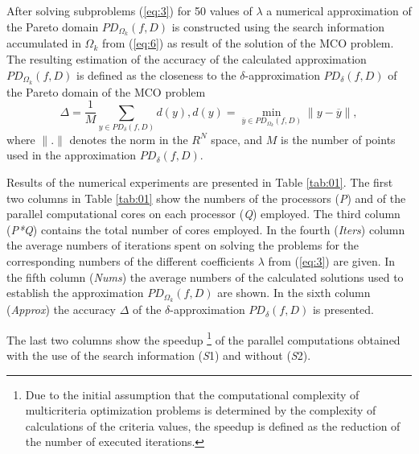 \documentclass[runningheads]{llncs}
\begin{document}
After solving subproblems (\ref{eq:3}) for 50 values of $\lambda$ a numerical approximation of the Pareto domain $PD_{\Omega_k}(f,D)$ is constructed using the search information accumulated in $\Omega_k$ from (\ref{eq:6}) as result of the solution of the MCO problem. The resulting estimation of the accuracy of the calculated approximation $PD_{\Omega_k}(f,D)$ is defined as the closeness to the $\delta$-approximation $PD_\delta(f,D)$ of the Pareto domain of the MCO problem 
\begin{equation}\label{eq:18}
\Delta=\frac{1}{M} \sum_{y\in PD_\delta(f,D)}{d(y)}, d(y)=\min_{\overline{y}\in PD_{\Omega_k}(f,D)}{\|y-\overline{y}\|},
\end{equation}
where $\|.\|$ denotes the norm in the $R^N$ space, and $M$ is the number of points used in the approximation $PD_{\delta}(f,D)$.

Results of the numerical experiments are presented in Table \ref{tab:01}. The first two columns in Table \ref{tab:01} show the numbers of the processors (\textit{P}) and of the parallel computational cores on each processor (\textit{Q}) employed. The third column (\textit{P*Q}) contains the total number of cores employed. In the fourth (\textit{Iters}) column the average numbers of iterations spent on solving the problems for the corresponding numbers of the different coefficients $\lambda$ from (\ref{eq:3}) are given. In the fifth column (\textit{Nums}) the average numbers of the calculated solutions used to establish the approximation $PD_{\Omega_k}(f,D)$ are shown. In the sixth column (\textit{Approx}) the accuracy $\Delta$ of the $\delta$-approximation $PD_\delta(f,D)$ is presented.

The last two columns show the speedup \footnote{Due to the initial assumption that the computational complexity of multicriteria optimization problems is determined by the complexity of calculations of the criteria values, the speedup is defined as the reduction of the number of  executed iterations.} of the parallel computations obtained with the use of the search information (\textit{S}1) and without (\textit{S}2).
\end{document}
